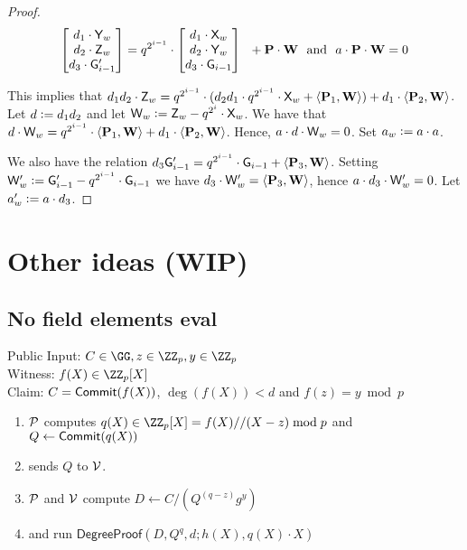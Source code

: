 \documentclass[12pt]{article}
\theoremstyle{Definition}
\begin{document}
\begin{proof}
$$  
\begin{bmatrix}
d_1 \cdot \mathsf{Y}_w \\ 
d_2 \cdot \mathsf{Z}_w \\ 
d_3 \cdot \mathsf{G}'_{i-1}
\end{bmatrix} 
= 
q^{2^{i-1}} \cdot
\begin{bmatrix}
d_1 \cdot \mathsf{X}_{w} \\ 
d_2 \cdot \mathsf{Y}_{w} \\ 
d_3 \cdot \mathsf{G}_{i-1}
\end{bmatrix}  \ \
+ 
\mathbf{P} \cdot 
\mathbf{W} \ \ \text{and} \ \ a \cdot \mathbf{P} \cdot \mathbf{W} = 0
$$

This implies that $d_1 d_2 \cdot \mathsf{Z}_w = q^{2^{i-1}} \cdot (d_2 d_1 \cdot q^{2^{i-1}} \cdot \mathsf{X}_w + \langle \mathbf{P}_1, \mathbf{W} \rangle) + d_1 \cdot \langle \mathbf{P}_2, \mathbf{W} \rangle$. Let $d \mathrel{\mathop:}= d_1 d_2$ and let $\mathsf{W}_w \mathrel{\mathop:}= \mathsf{Z}_w - q^{2^{i}} \cdot \mathsf{X}_w$. 
We have that $d \cdot \mathsf{W}_w = q^{2^{i-1}} \cdot \langle \mathbf{P}_1, \mathbf{W} \rangle  + d_1 \cdot \langle \mathbf{P}_2, \mathbf{W} \rangle$. Hence, $a \cdot d \cdot \mathsf{W}_w = 0$. Set $a_w \mathrel{\mathop:}= a \cdot a$. 
 
We also have the relation $d_3 \mathsf{G}'_{i-1} = q^{2^{i-1}} \cdot \mathsf{G}_{i-1} + \langle \mathbf{P}_3, \mathbf{W} \rangle$. Setting $\mathsf{W}'_w \mathrel{\mathop:}= \mathsf{G}'_{i-1} - q^{2^{i-1}} \cdot \mathsf{G}_{i-1}$ we have $d_3 \cdot \mathsf{W}'_w = \langle \mathbf{P}_3, \mathbf{W} \rangle$, hence $a \cdot d_3 \cdot \mathsf{W}'_w = 0$. Let $a'_w \mathrel{\mathop:}= a \cdot d_3$.  
	\end{proof}


\section{Other ideas (WIP)}
\subsection{No field elements eval}


\begin{mdframed}
Public Input: $C\in \GG,z\in \ZZ_p,y\in \ZZ_p$\\
Witness: $f(X) \in \ZZ_p[X]$ \\
Claim: $C=\textsf{{Commit}}(f(X))$, $\deg(f(X))<d$ and $f(z)=y \bmod p$
	\begin{enumerate}[nolistsep]
		\item $\mathcal{P}$ computes $q(X) \in \ZZ_p[X]=f(X)//(X-z) \bmod p$ and $Q\gets\textsf{{Commit}}(q(X))$
		\item \prover sends $Q$ to $\mathcal{V}$.
		\item $\mathcal{P}$ and $\mathcal{V}$ compute $D\gets C/(Q^{(q-z)}g^y)$ 

		\item \prover and \verifier run $\textsf{DegreeProof}(D,Q^q,d;h(X),q(X)\cdot X)$
	\end{enumerate}
\end{mdframed}
\end{document}
